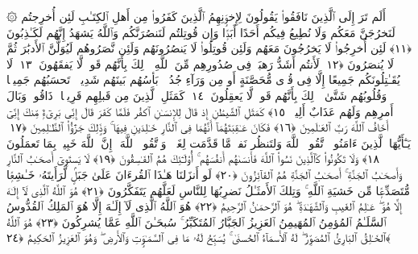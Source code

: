  ۞ أَلَم تَرَ إِلَى ٱلَّذِينَ نَافَقُوا۟ يَقُولُونَ لِإِخوَٟنِهِمُ ٱلَّذِينَ كَفَرُوا۟ مِن أَهلِ ٱلكِتَـٰبِ لَئِن أُخرِجتُم لَنَخرُجَنَّ مَعَكُم وَلَا نُطِيعُ فِيكُم أَحَدًا أَبَدًۭا وَإِن قُوتِلتُم لَنَنصُرَنَّكُم وَٱللَّهُ يَشهَدُ إِنَّهُم لَكَـٰذِبُونَ ﴿١١﴾
 لَئِن أُخرِجُوا۟ لَا يَخرُجُونَ مَعَهُم وَلَئِن قُوتِلُوا۟ لَا يَنصُرُونَهُم وَلَئِن نَّصَرُوهُم لَيُوَلُّنَّ ٱلأَدبَٰرَ ثُمَّ لَا يُنصَرُونَ ﴿١٢﴾
 لَأَنتُم أَشَدُّ رَهبَةًۭ فِى صُدُورِهِم مِّنَ ٱللَّهِ ۚ ذَٟلِكَ بِأَنَّهُم قَومٌۭ لَّا يَفقَهُونَ ﴿١٣﴾
 لَا يُقَـٰتِلُونَكُم جَمِيعًا إِلَّا فِى قُرًۭى مُّحَصَّنَةٍ أَو مِن وَرَآءِ جُدُرٍۭ ۚ بَأسُهُم بَينَهُم شَدِيدٌۭ ۚ تَحسَبُهُم جَمِيعًۭا وَقُلُوبُهُم شَتَّىٰ ۚ ذَٟلِكَ بِأَنَّهُم قَومٌۭ لَّا يَعقِلُونَ ﴿١٤﴾
 كَمَثَلِ ٱلَّذِينَ مِن قَبلِهِم قَرِيبًۭا ۖ ذَاقُوا۟ وَبَالَ أَمرِهِم وَلَهُم عَذَابٌ أَلِيمٌۭ ﴿١٥﴾
 كَمَثَلِ ٱلشَّيطَٰنِ إِذ قَالَ لِلإِنسَـٰنِ ٱكفُر فَلَمَّا كَفَرَ قَالَ إِنِّى بَرِىٓءٌۭ مِّنكَ إِنِّىٓ أَخَافُ ٱللَّهَ رَبَّ ٱلعَـٰلَمِينَ ﴿١٦﴾
 فَكَانَ عَـٰقِبَتَهُمَآ أَنَّهُمَا فِى ٱلنَّارِ خَـٰلِدَينِ فِيهَا ۚ وَذَٟلِكَ جَزَٰٓؤُا۟ ٱلظَّـٰلِمِينَ ﴿١٧﴾
 يَـٰٓأَيُّهَا ٱلَّذِينَ ءَامَنُوا۟ ٱتَّقُوا۟ ٱللَّهَ وَلتَنظُر نَفسٌۭ مَّا قَدَّمَت لِغَدٍۢ ۖ وَٱتَّقُوا۟ ٱللَّهَ ۚ إِنَّ ٱللَّهَ خَبِيرٌۢ بِمَا تَعمَلُونَ ﴿١٨﴾
 وَلَا تَكُونُوا۟ كَٱلَّذِينَ نَسُوا۟ ٱللَّهَ فَأَنسَىٰهُم أَنفُسَهُم ۚ أُو۟لَـٰٓئِكَ هُمُ ٱلفَـٰسِقُونَ ﴿١٩﴾
 لَا يَستَوِىٓ أَصحَـٰبُ ٱلنَّارِ وَأَصحَـٰبُ ٱلجَنَّةِ ۚ أَصحَـٰبُ ٱلجَنَّةِ هُمُ ٱلفَآئِزُونَ ﴿٢٠﴾
 لَو أَنزَلنَا هَـٰذَا ٱلقُرءَانَ عَلَىٰ جَبَلٍۢ لَّرَأَيتَهُۥ خَـٰشِعًۭا مُّتَصَدِّعًۭا مِّن خَشيَةِ ٱللَّهِ ۚ وَتِلكَ ٱلأَمثَـٰلُ نَضرِبُهَا لِلنَّاسِ لَعَلَّهُم يَتَفَكَّرُونَ ﴿٢١﴾
 هُوَ ٱللَّهُ ٱلَّذِى لَآ إِلَـٰهَ إِلَّا هُوَ ۖ عَـٰلِمُ ٱلغَيبِ وَٱلشَّهَـٰدَةِ ۖ هُوَ ٱلرَّحمَـٰنُ ٱلرَّحِيمُ ﴿٢٢﴾
 هُوَ ٱللَّهُ ٱلَّذِى لَآ إِلَـٰهَ إِلَّا هُوَ ٱلمَلِكُ ٱلقُدُّوسُ ٱلسَّلَـٰمُ ٱلمُؤمِنُ ٱلمُهَيمِنُ ٱلعَزِيزُ ٱلجَبَّارُ ٱلمُتَكَبِّرُ ۚ سُبحَـٰنَ ٱللَّهِ عَمَّا يُشرِكُونَ ﴿٢٣﴾
 هُوَ ٱللَّهُ ٱلخَـٰلِقُ ٱلبَارِئُ ٱلمُصَوِّرُ ۖ لَهُ ٱلأَسمَآءُ ٱلحُسنَىٰ ۚ يُسَبِّحُ لَهُۥ مَا فِى ٱلسَّمَـٰوَٟتِ وَٱلأَرضِ ۖ وَهُوَ ٱلعَزِيزُ ٱلحَكِيمُ ﴿٢٤﴾
 
